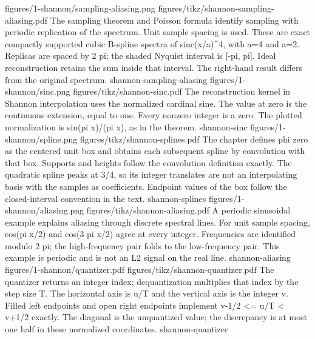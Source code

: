 {figures/1-shannon/sampling-aliasing.png}
{figures/tikz/shannon-sampling-aliasing.pdf}
{The sampling theorem and Poisson formula identify sampling with periodic replication of the spectrum.}
{Unit sample spacing is used. These are exact compactly supported cubic B-spline spectra of sinc(x/a)\textasciicircum{}4, with a=4 and a=2. Replicas are spaced by 2 pi; the shaded Nyquist interval is [-pi, pi]. Ideal reconstruction retains the sum inside that interval. The right-hand result differs from the original spectrum.}
{shannon-sampling-aliasing}
{figures/1-shannon/sinc.png}
{figures/tikz/shannon-sinc.pdf}
{The reconstruction kernel in Shannon interpolation uses the normalized cardinal sine.}
{The value at zero is the continuous extension, equal to one. Every nonzero integer is a zero. The plotted normalization is sin(pi x)/(pi x), as in the theorem.}
{shannon-sinc}
{figures/1-shannon/spline.png}
{figures/tikz/shannon-splines.pdf}
{The chapter defines phi zero as the centered unit box and obtains each subsequent spline by convolution with that box.}
{Supports and heights follow the convolution definition exactly. The quadratic spline peaks at 3/4, so its integer translates are not an interpolating basis with the samples as coefficients. Endpoint values of the box follow the closed-interval convention in the text.}
{shannon-splines}
{figures/1-shannon/aliasing.png}
{figures/tikz/shannon-aliasing.pdf}
{A periodic sinusoidal example explains aliasing through discrete spectral lines.}
{For unit sample spacing, cos(pi x/2) and cos(3 pi x/2) agree at every integer. Frequencies are identified modulo 2 pi; the high-frequency pair folds to the low-frequency pair. This example is periodic and is not an L2 signal on the real line.}
{shannon-aliasing}
{figures/1-shannon/quantizer.pdf}
{figures/tikz/shannon-quantizer.pdf}
{The quantizer returns an integer index; dequantization multiplies that index by the step size T.}
{The horizontal axis is u/T and the vertical axis is the integer v. Filled left endpoints and open right endpoints implement v-1/2 <= u/T < v+1/2 exactly. The diagonal is the unquantized value; the discrepancy is at most one half in these normalized coordinates.}
{shannon-quantizer}

